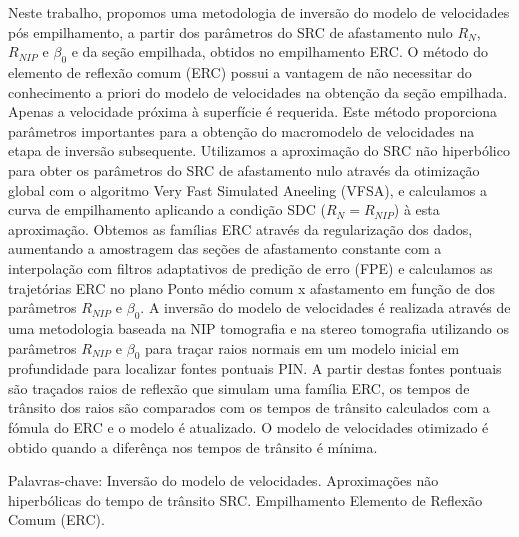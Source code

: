 \documentclass[
	12pt,				%
	openright,			%
	oneside,			%
	a4paper,			%
	english,			%
	brazil				%
	]{abntex2}
\begin{document}
\begin{resumo}
\OnehalfSpacing

Neste trabalho, propomos uma metodologia de inversão do modelo de velocidades pós empilhamento, a partir dos
parâmetros do SRC de afastamento nulo $R_N$, $R_{NIP}$ e $\beta_0$ e da seção empilhada, obtidos no empilhamento ERC.
O método do elemento de reflexão comum (ERC) possui a vantagem de 
não necessitar do conhecimento a priori do modelo de velocidades na obtenção da seção empilhada.
Apenas a velocidade próxima à superfície é requerida. 
Este método proporciona parâmetros importantes para a obtenção do
macromodelo de velocidades na etapa de inversão subsequente.
Utilizamos a aproximação do SRC não hiperbólico para
obter os parâmetros do SRC de afastamento nulo através da otimização global com o algoritmo Very Fast Simulated Aneeling (VFSA),
e calculamos a curva de empilhamento aplicando a condição SDC ($R_N=R_{NIP}$) à esta aproximação.
Obtemos as famílias ERC através da regularização dos dados, aumentando a amostragem das seções de afastamento constante
com a interpolação com filtros adaptativos de predição de erro (FPE) e calculamos as trajetórias ERC 
no plano Ponto médio comum x afastamento em função de dos parâmetros $R_{NIP}$ e $\beta_0$.
A inversão do modelo de velocidades é realizada através de uma metodologia baseada na NIP tomografia
e na stereo tomografia utilizando os parâmetros $R_{NIP}$ e $\beta_0$ para traçar raios normais em um
modelo inicial em profundidade para localizar fontes pontuais PIN.
A partir destas fontes pontuais são traçados raios de reflexão que simulam
uma família ERC, os tempos de trânsito dos raios são comparados com os tempos de trânsito calculados com
a fómula do ERC e o modelo é atualizado.
O modelo de velocidades otimizado é obtido quando a diferênça nos tempos de trânsito é
mínima.
\vspace{\onelineskip} 
 \noindent
 \par Palavras-chave: Inversão do modelo de velocidades. Aproximações não hiperbólicas do tempo de trânsito SRC. 
 Empilhamento Elemento de Reflexão Comum (ERC). 
\end{resumo}
\end{document}
